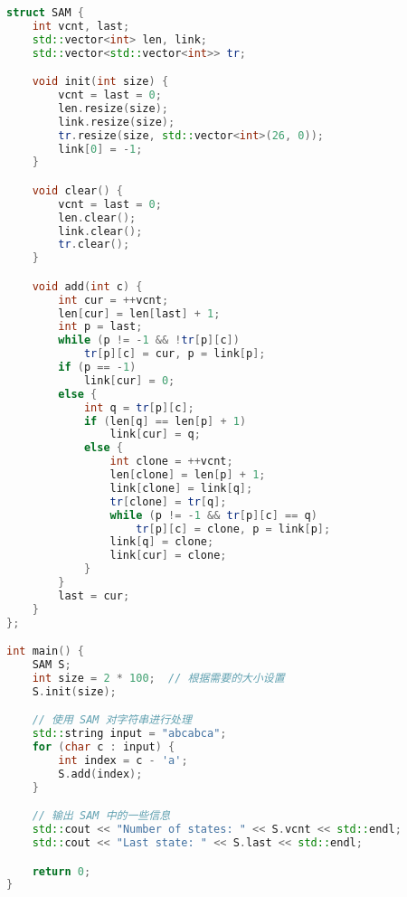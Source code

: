\begin{lstlisting}[language = c++]
struct SAM {
    int vcnt, last;
    std::vector<int> len, link;
    std::vector<std::vector<int>> tr;

    void init(int size) {
        vcnt = last = 0;
        len.resize(size);
        link.resize(size);
        tr.resize(size, std::vector<int>(26, 0));
        link[0] = -1;
    }

    void clear() {
        vcnt = last = 0;
        len.clear();
        link.clear();
        tr.clear();
    }

    void add(int c) {
        int cur = ++vcnt;
        len[cur] = len[last] + 1;
        int p = last;
        while (p != -1 && !tr[p][c])
            tr[p][c] = cur, p = link[p];
        if (p == -1)
            link[cur] = 0;
        else {
            int q = tr[p][c];
            if (len[q] == len[p] + 1)
                link[cur] = q;
            else {
                int clone = ++vcnt;
                len[clone] = len[p] + 1;
                link[clone] = link[q];
                tr[clone] = tr[q];
                while (p != -1 && tr[p][c] == q)
                    tr[p][c] = clone, p = link[p];
                link[q] = clone;
                link[cur] = clone;
            }
        }
        last = cur;
    }
};

int main() {
    SAM S;
    int size = 2 * 100;  // 根据需要的大小设置
    S.init(size);

    // 使用 SAM 对字符串进行处理
    std::string input = "abcabca";
    for (char c : input) {
        int index = c - 'a';
        S.add(index);
    }

    // 输出 SAM 中的一些信息
    std::cout << "Number of states: " << S.vcnt << std::endl;
    std::cout << "Last state: " << S.last << std::endl;

    return 0;
}
\end{lstlisting}